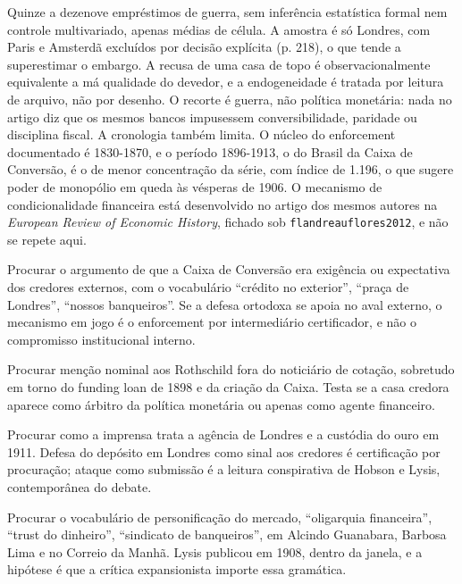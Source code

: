 Quinze a dezenove empréstimos de guerra, sem inferência estatística formal nem
controle multivariado, apenas médias de célula. A amostra é só Londres, com
Paris e Amsterdã excluídos por decisão explícita (p. 218), o que tende a
superestimar o embargo. A recusa de uma casa de topo é observacionalmente
equivalente a má qualidade do devedor, e a endogeneidade é tratada por leitura
de arquivo, não por desenho. O recorte é guerra, não política monetária: nada
no artigo diz que os mesmos bancos impusessem conversibilidade, paridade ou
disciplina fiscal. A cronologia também limita. O núcleo do enforcement
documentado é 1830-1870, e o período 1896-1913, o do Brasil da Caixa de
Conversão, é o de menor concentração da série, com índice de 1.196, o que
sugere poder de monopólio em queda às vésperas de 1906. O mecanismo de
condicionalidade financeira está desenvolvido no artigo dos mesmos autores na
\textit{European Review of Economic History}, fichado sob
\texttt{flandreauflores2012}, e não se repete aqui.

\begin{dialogo}
\item Procurar o argumento de que a Caixa de Conversão era exigência ou
expectativa dos credores externos, com o vocabulário ``crédito no exterior'',
``praça de Londres'', ``nossos banqueiros''. Se a defesa ortodoxa se apoia no
aval externo, o mecanismo em jogo é o enforcement por intermediário
certificador, e não o compromisso institucional interno.
\item Procurar menção nominal aos Rothschild fora do noticiário de cotação,
sobretudo em torno do funding loan de 1898 e da criação da Caixa. Testa se a
casa credora aparece como árbitro da política monetária ou apenas como agente
financeiro.
\item Procurar como a imprensa trata a agência de Londres e a custódia do ouro
em 1911. Defesa do depósito em Londres como sinal aos credores é certificação
por procuração; ataque como submissão é a leitura conspirativa de Hobson e
Lysis, contemporânea do debate.
\item Procurar o vocabulário de personificação do mercado, ``oligarquia
financeira'', ``trust do dinheiro'', ``sindicato de banqueiros'', em Alcindo
Guanabara, Barbosa Lima e no Correio da Manhã. Lysis publicou em 1908, dentro
da janela, e a hipótese é que a crítica expansionista importe essa gramática.
\end{dialogo}

